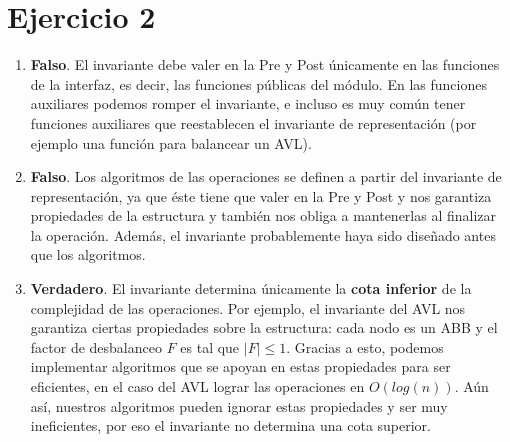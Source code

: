 \section*{Ejercicio 2}

\begin{enumerate}
    \item \textbf{Falso}. El invariante debe valer en la Pre y Post únicamente en las funciones de la interfaz, es decir, las funciones públicas del módulo. En las funciones auxiliares podemos romper el invariante, e incluso es muy común tener funciones auxiliares que reestablecen el invariante de representación (por ejemplo una función para balancear un AVL).
    \item \textbf{Falso}. Los algoritmos de las operaciones se definen a partir del invariante de representación, ya que éste tiene que valer en la Pre y Post y nos garantiza propiedades de la estructura y también nos obliga a mantenerlas al finalizar la operación. Además, el invariante probablemente haya sido diseñado antes que los algoritmos.
    \item \textbf{Verdadero}. El invariante determina únicamente la \textbf{cota inferior} de la complejidad de las operaciones. Por ejemplo, el invariante del AVL nos garantiza ciertas propiedades sobre la estructura: cada nodo es un ABB y el factor de desbalanceo $F$ es tal que $|F| \leq 1$. Gracias a esto, podemos implementar algoritmos que se apoyan en estas propiedades para ser eficientes, en el caso del AVL lograr las operaciones en $O(log(n))$. Aún así, nuestros algoritmos pueden ignorar estas propiedades y ser muy ineficientes, por eso el invariante no determina una cota superior.
\end{enumerate}
